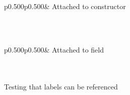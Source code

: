 \medbreak
\label{container-page-test-module-Labels-type-u}\\
\begin{ocamltabular}{p{0.500\textwidth}p{0.500\textwidth}}\label{container-page-test-module-Labels-type-u.A'}& Attached to constructor\\
\end{ocamltabular}%
\\
\label{container-page-test-module-Labels-type-v}\\
\begin{ocamltabular}{p{0.500\textwidth}p{0.500\textwidth}}\label{container-page-test-module-Labels-type-v.f}& Attached to field\\
\end{ocamltabular}%
\\
\ocamlcodefragment{\}}\\
Testing that labels can be referenced

